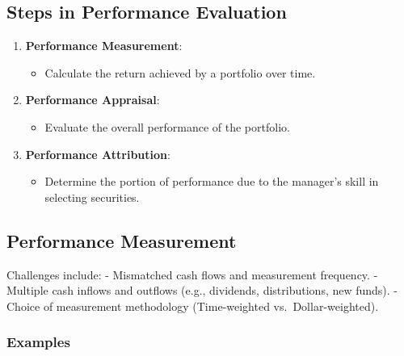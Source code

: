 \documentclass[
]{book}
\providecommand{\tightlist}{%
  \setlength{\itemsep}{0pt}\setlength{\parskip}{0pt}}
\begin{document}
\hypertarget{steps-in-performance-evaluation}{%
\subsection{Steps in Performance
Evaluation}\label{steps-in-performance-evaluation}}

\begin{enumerate}
\def\labelenumi{\arabic{enumi}.}
\tightlist
\item
  \textbf{Performance Measurement}:

  \begin{itemize}
  \tightlist
  \item
    Calculate the return achieved by a portfolio over time.
  \end{itemize}
\item
  \textbf{Performance Appraisal}:

  \begin{itemize}
  \tightlist
  \item
    Evaluate the overall performance of the portfolio.
  \end{itemize}
\item
  \textbf{Performance Attribution}:

  \begin{itemize}
  \tightlist
  \item
    Determine the portion of performance due to the manager's skill in
    selecting securities.
  \end{itemize}
\end{enumerate}

\hypertarget{performance-measurement}{%
\subsection{Performance Measurement}\label{performance-measurement}}

Challenges include: - Mismatched cash flows and measurement frequency. -
Multiple cash inflows and outflows (e.g., dividends, distributions, new
funds). - Choice of measurement methodology (Time-weighted
vs.~Dollar-weighted).

\hypertarget{examples}{%
\subsubsection{Examples}\label{examples}}
\end{document}
